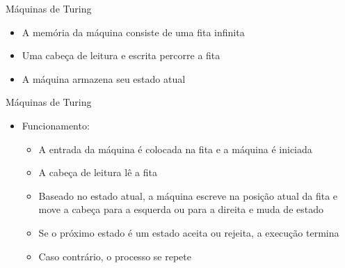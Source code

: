 \documentclass{beamer}
\begin{document}
\begin{frame}{Máquinas de Turing}
	\begin{itemize}
		\item A memória da máquina consiste de uma fita infinita
		\item Uma cabeça de leitura e escrita percorre a fita
		\item A máquina armazena seu estado atual
	\end{itemize}
	\begin{center}
		\renewcommand{\TuringInput} {a,b,a,b,$\sqcup$,$\sqcup$,$\sqcup$}
		\renewcommand{\TuringHead} 3
		\renewcommand{\TuringState} {$q_{1}$}
		\renewcommand{\TuringRightEnd} {$\ldots$}
		\renewcommand{\TuringLeftEnd} {}
		\TuringMachine
	\end{center}
\end{frame}
\begin{frame}{Máquinas de Turing}
	\begin{itemize}
		\item Funcionamento:
		\begin{itemize}
			\item A entrada da máquina é colocada na fita e a máquina é iniciada
			\item A cabeça de leitura lê a fita
			\item Baseado no estado atual, a máquina escreve na posição atual da fita e move a cabeça para a esquerda ou para a direita e muda de estado
			\item Se o próximo estado é um estado \alert{aceita} ou \alert{rejeita}, a execução termina
			\item Caso contrário, o processo se repete
		\end{itemize}
	\end{itemize}
\end{frame}
\end{document}
